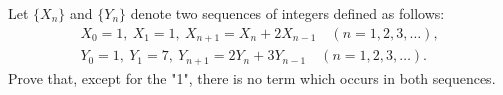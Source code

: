 Let $ \{X_n\}$ and $ \{Y_n\}$ denote two sequences of integers defined as follows:\begin{align*} X_0 = 1,\ X_1 = 1,\ X_{n + 1} = X_n + 2X_{n - 1} \quad (n = 1,2,3,\ldots), \\

Y_0 = 1,\ Y_1 = 7,\ Y_{n + 1} = 2Y_n + 3Y_{n - 1} \quad (n = 1,2,3,\ldots).\end{align*}Prove that, except for the "1", there is no term which occurs in both sequences.